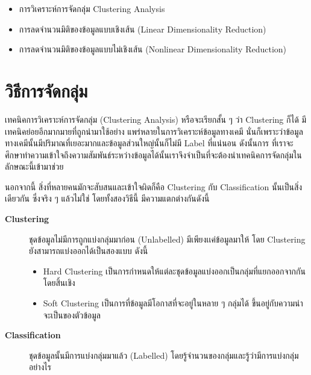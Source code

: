 \begin{itemize}[topsep=0pt]
    \item การวิเคราะห์การจัดกลุ่ม Clustering Analysis
    
    \item การลดจำนวนมิติของข้อมูลแบบเชิงเส้น (Linear Dimensionality Reduction)
    
    \item การลดจำนวนมิติของข้อมูลแบบไม่เชิงเส้น (Nonlinear Dimensionality Reduction)
\end{itemize}

\section{วิธีการจัดกลุ่ม}
\label{sec:clustering}

เทคนิคการวิเคราะห์การจัดกลุ่ม (Clustering Analysis) หรือจะเรียกสั้น ๆ ว่า Clustering ก็ได้ มีเทคนิคย่อยอีกมากมายที่ถูกนำมาใช้อย่าง%
แพร่หลายในการวิเคราะห์ข้อมูลทางเคมี นั่นก็เพราะว่าข้อมูลทางเคมีนั้นมีปริมาณที่เยอะมากและข้อมูลส่วนใหญ่นั้นก็ไม่มี Label ที่แน่นอน ดังนั้นการ%
ที่เราจะศึกษาทำความเข้าใจถึงความสัมพันธ์ระหว่างข้อมูลได้นั้นเราจึงจำเป็นที่จะต้องนำเทคนิคการจัดกลุ่มในลักษณะนี้เข้ามาช่วย

นอกจากนี้ สิ่งที่หลายคนมักจะสับสนและเข้าใจผิดก็คือ Clustering กับ Classification นั้นเป็นสิ่งเดียวกัน ซึ่งจริง ๆ แล้วไม่ใช่ โดยทั้งสองวิธีนี้%
มีความแตกต่างกันดังนี้

\begin{description}
    \item[\textbf{Clustering}] ชุดข้อมูลไม่มีการถูกแบ่งกลุ่มมาก่อน (Unlabelled) มีเพียงเเค่ข้อมูลมาให้ โดย Clustering 
    ยังสามารถแบ่งออกได้เป็นสองแบบ ดังนี้
    \begin{itemize}
        \item Hard Clustering เป็นการกำหนดให้แต่ละชุดข้อมูลแบ่งออกเป็นกลุ่มที่แยกออกจากกันโดยสิ้นเชิง
        
        \item Soft Clustering เป็นการที่ข้อมูลมีโอกาสที่จะอยู่ในหลาย ๆ กลุ่มได้ ขึ้นอยู่กับความน่าจะเป็นของตัวข้อมูล
    \end{itemize}
    \item[\textbf{Classification}] ชุดข้อมูลนั้นมีการแบ่งกลุ่มมาแล้ว (Labelled) โดยรู้จำนวนของกลุ่มและรู้ว่ามีการแบ่งกลุ่มอย่างไร
\end{description}

